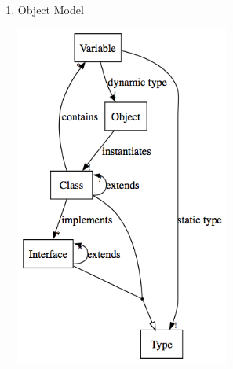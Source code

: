 \documentclass[11pt,letterpaper]{article}
\begin{document}
\begin{itemize}
\begin{enumerate}
\item Object Model\\
\begin{center}
\includegraphics[width=200pt]{dot/b4.png}
\label{fig:ob4} 
\end{center}
\end{enumerate}

\end{itemize}
\end{document}
